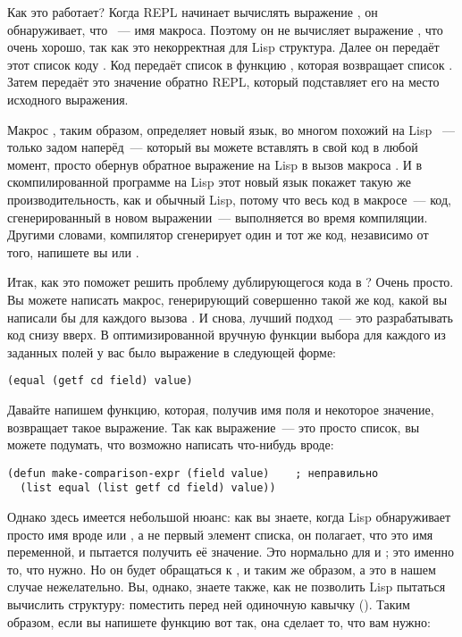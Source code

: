 Как это работает? Когда REPL начинает вычислять выражение , он
обнаруживает, что ~--- имя макроса. Поэтому он не вычисляет выражение
, что очень хорошо, так как это некорректная для Lisp
структура. Далее он передаёт этот список коду . Код 
передаёт список в функцию , которая возвращает список . Затем  передаёт это значение обратно REPL, который
подставляет его на место исходного выражения.

Макрос , таким образом, определяет новый язык, во многом похожий на Lisp
~--- только задом наперёд~--- который вы можете вставлять в свой код в любой момент, просто
обернув обратное выражение на Lisp в вызов макроса . И в скомпилированной
программе на Lisp этот новый язык покажет такую же производительность, как и обычный Lisp,
потому что весь код в макросе~--- код, сгенерированный в новом выражении~--- выполняется
во время компиляции. Другими словами, компилятор сгенерирует один и тот же код, независимо
от того, напишете вы  или .

Итак, как это поможет решить проблему дублирующегося кода в ? Очень просто. Вы
можете написать макрос, генерирующий совершенно такой же код, какой вы написали бы для
каждого вызова . И снова, лучший подход~--- это разрабатывать код снизу
вверх. В оптимизированной вручную функции выбора  для каждого из заданных
полей у вас было выражение в следующей форме:

\begin{lstlisting}
(equal (getf cd field) value)
\end{lstlisting}

Давайте напишем функцию, которая, получив имя поля и некоторое значение, возвращает такое
выражение. Так как выражение~--- это просто список, вы можете подумать, что возможно
написать что-нибудь вроде:

\begin{lstlisting}
(defun make-comparison-expr (field value)    ; неправильно
  (list equal (list getf cd field) value))
\end{lstlisting}

Однако здесь имеется небольшой нюанс: как вы знаете, когда Lisp обнаруживает просто имя
вроде  или , а не первый элемент списка, он полагает, что это имя
переменной, и пытается получить её значение. Это нормально для  и
; это именно то, что нужно. Но он будет обращаться к , 
и  таким же образом, а это в нашем случае нежелательно. Вы, однако, знаете также,
как не позволить Lisp пытаться вычислить структуру: поместить перед ней одиночную кавычку
(). Таким образом, если вы напишете функцию  вот так,
она сделает то, что вам нужно:

